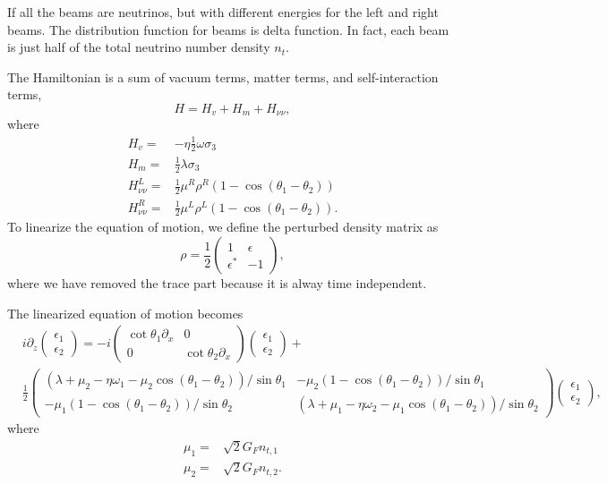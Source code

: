 If all the beams are neutrinos, but with different energies for the left and right beams. The distribution function for beams is delta function. In fact, each beam is just half of the total neutrino number density $n_t$.

The Hamiltonian is a sum of vacuum terms, matter terms, and self-interaction terms,
\begin{equation}
   H= H_v + H_m + H_{\nu\nu},
\end{equation}
where
\begin{align}
   H_v =& - \eta \frac{1}{2}\omega \sigma_3 \\
   H_m =& \frac{1}{2}\lambda \sigma_3\\
   H_{\nu\nu}^L =& \frac{1}{2}\mu^R \rho^R (1-\cos(\theta_1-\theta_2))\\
   H_{\nu\nu}^R =& \frac{1}{2}\mu^L \rho^L (1-\cos(\theta_1-\theta_2)).
\end{align}
To linearize the equation of motion, we define the perturbed density matrix as
\begin{equation}
   \rho = \frac{1}{2}\begin{pmatrix}
   1 & \epsilon\\
   \epsilon^* & -1
   \end{pmatrix},
\end{equation}
where we have removed the trace part because it is alway time independent.


The linearized equation of motion becomes
\small\begin{align}
   &i \partial_z \begin{pmatrix}
   \epsilon_1 \\
   \epsilon_2
   \end{pmatrix} =  - i \begin{pmatrix}\cot\theta_1\partial_x & 0 \\
   0 & \cot\theta_2 \partial_x
   \end{pmatrix} \begin{pmatrix}
   \epsilon_1 \\
   \epsilon_2
   \end{pmatrix} + \nonumber\\
   &
   \frac{1}{2}\begin{pmatrix}
   (\lambda+ \mu_2 - \eta \omega_1 - \mu_2 \cos(\theta_1-\theta_2) )/\sin \theta_1 & -\mu_2 (1-\cos(\theta_1-\theta_2)) /\sin \theta_1\\
   -\mu_1 (1- \cos(\theta_1-\theta_2))/\sin\theta_2 & (\lambda + \mu_1 - \eta \omega_2 - \mu_1 \cos(\theta_1-\theta_2) )/\sin\theta_2
   \end{pmatrix}\begin{pmatrix}
   \epsilon_1 \\
   \epsilon_2
   \end{pmatrix},
   \label{chap:dr-sec:two-beams-eqn:line-model-two-beams-all-neutrino-linearized-eom}
\end{align}\normalsize
where
\begin{align*}
   \mu_1 =& \sqrt{2}G_F n_{t,1}\\
   \mu_2 =& \sqrt{2}G_F n_{t,2}.
\end{align*}



